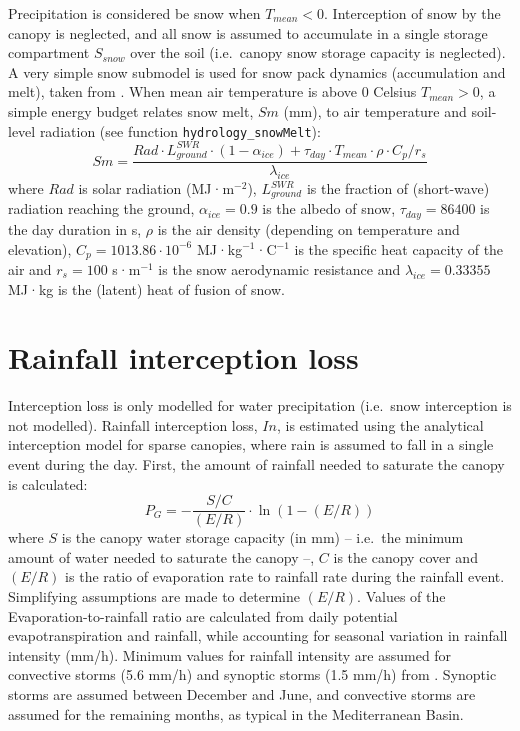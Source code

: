 \documentclass[]{book}
\begin{document}
Precipitation is considered be snow when \(T_{mean}<0\). Interception of snow by the canopy is neglected, and all snow is assumed to accumulate in a single storage compartment \(S_{snow}\) over the soil (i.e.~canopy snow storage capacity is neglected). A very simple snow submodel is used for snow pack dynamics (accumulation and melt), taken from \citet{Kergoat1998}. When mean air temperature is above 0 Celsius \(T_{mean}>0\), a simple energy budget relates snow melt, \(Sm\) (mm), to air temperature and soil-level radiation (see function \texttt{hydrology\_snowMelt}):
\begin{equation}
Sm = \frac{Rad\cdot L^{SWR}_{ground}\cdot (1-\alpha_{ice}) + \tau_{day} \cdot T_{mean} \cdot \rho \cdot C_p/r_{s}}{\lambda_{ice}}
\end{equation}
where \(Rad\) is solar radiation (MJ·m\(^{-2}\)), \(L^{SWR}_{ground}\) is the fraction of (short-wave) radiation reaching the ground, \(\alpha_{ice} = 0.9\) is the albedo of snow, \(\tau_{day} = 86400\) is the day duration in s, \(\rho\) is the air density (depending on temperature and elevation), \(C_{p} = 1013.86 \cdot 10^{-6}\) MJ·kg\(^{-1}\)·C\(^{-1}\) is the specific heat capacity of the air and \(r_{s} = 100\) s·m\(^{-1}\) is the snow aerodynamic resistance and \(\lambda_{ice} = 0.33355\)MJ·kg is the (latent) heat of fusion of snow.

\hypertarget{interception}{%
\section{Rainfall interception loss}\label{interception}}

Interception loss is only modelled for water precipitation (i.e.~snow interception is not modelled). Rainfall interception loss, \(In\), is estimated using the \citet{Gash1995} analytical interception model for sparse canopies, where rain is assumed to fall in a single event during the day. First, the amount of rainfall needed to saturate the canopy is calculated:
\begin{equation}
P_G = - \frac{S/C}{(E/R)} \cdot \ln(1-(E/R))
\end{equation}
where \(S\) is the canopy water storage capacity (in mm) -- i.e.~the minimum amount
of water needed to saturate the canopy --, \(C\) is the canopy cover and \((E/R)\) is
the ratio of evaporation rate to rainfall rate during the rainfall event.
Simplifying assumptions are made to determine \((E/R)\). Values of the Evaporation-to-rainfall ratio are calculated from daily potential evapotranspiration and rainfall, while accounting for seasonal variation in rainfall intensity (mm/h). Minimum values for rainfall intensity are assumed for convective storms (5.6 mm/h) and synoptic storms (1.5 mm/h) from \citet{Miralles2010}. Synoptic storms are assumed between December and June, and convective storms are assumed for the remaining months, as typical in the Mediterranean Basin.
\end{document}

